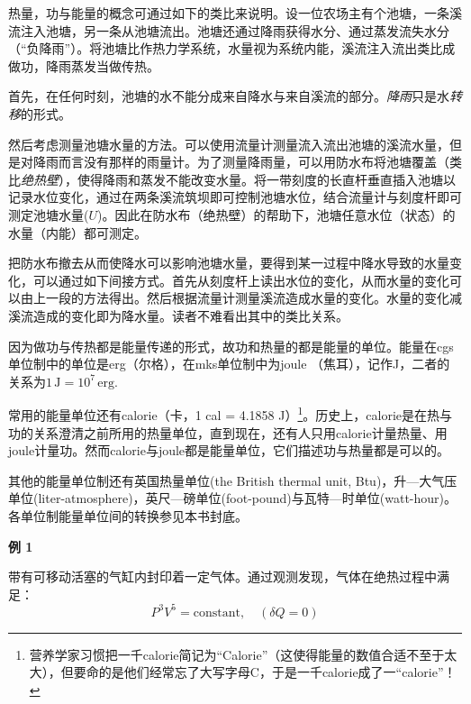 热量，功与能量的概念可通过如下的类比来说明。设一位农场主有个池塘，一条溪流注入池塘，另一条从池塘流出。池塘还通过降雨获得水分、通过蒸发流失水分（“负降雨”）。将池塘比作热力学系统，水量视为系统内能，溪流注入流出类比成做功，降雨蒸发当做传热。

首先，在任何时刻，池塘的水不能分成来自降水与来自溪流的部分。{\it 降雨}只是水{\it 转移}的形式。

然后考虑测量池塘水量的方法。可以使用流量计测量流入流出池塘的溪流水量，但是对降雨而言没有那样的雨量计。为了测量降雨量，可以用防水布将池塘覆盖（类比{\it 绝热壁}），使得降雨和蒸发不能改变水量。将一带刻度的长直杆垂直插入池塘以记录水位变化，通过在两条溪流筑坝即可控制池塘水位，结合流量计与刻度杆即可测定池塘水量($U$)。因此在防水布（绝热壁）的帮助下，池塘任意水位（状态）的水量（内能）都可测定。

把防水布撤去从而使降水可以影响池塘水量，要得到某一过程中降水导致的水量变化，可以通过如下间接方式。首先从刻度杆上读出水位的变化，从而水量的变化可以由上一段的方法得出。然后根据流量计测量溪流造成水量的变化。水量的变化减溪流造成的变化即为降水量。读者不难看出其中的类比关系。

因为做功与传热都是能量传递的形式，故功和热量的都是能量的单位。能量在cgs单位制中的单位是erg（尔格），在mks单位制中为joule （焦耳），记作J，二者的关系为$1\, \mathrm{J} = 10^7\, \mathrm{erg}.$

常用的能量单位还有calorie（卡，1 cal = 4.1858 J）\footnote{营养学家习惯把一千calorie简记为``Calorie''（这使得能量的数值合适不至于太大），但要命的是他们经常忘了大写字母C，于是一千calorie成了一``calorie''！}。历史上，calorie是在热与功的关系澄清之前所用的热量单位，直到现在，还有人只用calorie计量热量、用joule计量功。然而calorie与joule都是能量单位，它们描述功与热量都是可以的。

其他的能量单位制还有英国热量单位(the British thermal unit, Btu)，升—大气压单位(liter-atmosphere)，英尺—磅单位(foot-pound)与瓦特—时单位(watt-hour)。各单位制能量单位间的转换参见本书封底。

{\bf {\large 例 1}}
\ 

带有可移动活塞的气缸内封印着一定气体。通过观测发现，气体在绝热过程中满足：
\[
	P^3 V^5 = \text{constant}, \quad (\delta Q = 0)
\]

